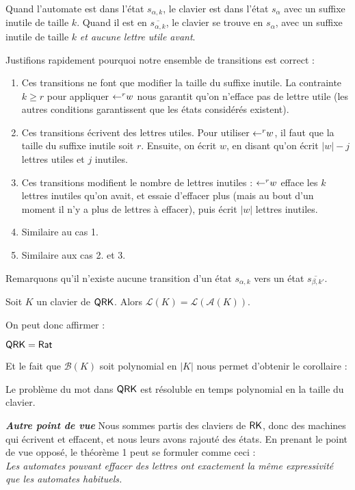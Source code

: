 \documentclass[12pt, a4paper]{article}
\renewcommand{\L}{\mathcal{L}}
\renewcommand{\bar}{\overline}
\newcommand{\A}{\mathcal{A}}
\newcounter{thm}
\begin{document}
    \begin{example}[Intuition]    
    Quand l'automate est dans l'état $s_{\alpha,k}$, le clavier est dans l'état $s_\alpha$ avec un suffixe inutile de taille $k$. Quand il est en $\overline{s_{\alpha,k}}$, le clavier se trouve en $s_\alpha$, avec un suffixe inutile de taille $k$ \emph{et aucune lettre utile avant}. 
    \end{example}
    Justifions rapidement pourquoi notre ensemble de transitions est correct :
    \begin{enumerate}
        \item Ces transitions ne font que modifier la taille du suffixe inutile. La contrainte $k \geqslant r$ pour appliquer $\mathord{\leftarrow}^r w$ nous garantit qu'on n'efface pas de lettre utile (les autres conditions garantissent que les états considérés existent).
        \item Ces transitions écrivent des lettres utiles. Pour utiliser $\mathord{\leftarrow}^r w$, il faut que la taille du suffixe inutile soit $r$. Ensuite, on écrit $w$, en disant qu'on écrit $|w|-j$ lettres utiles et $j$ inutiles.
        \item Ces transitions modifient le nombre de lettres inutiles : $\mathord{\leftarrow}^r w$ efface les $k$ lettres inutiles qu'on avait, et essaie d'effacer plus (mais au bout d'un moment il n'y a plus de lettres à effacer), puis écrit $|w|$ lettres inutiles.
        \item Similaire au cas 1.
        \item Similaire aux cas 2. et 3.
    \end{enumerate}
    Remarquons qu'il n'existe aucune transition d'un état $s_{\alpha, k}$ vers un état $\bar{s_{\beta, k'}}$.

    \begin{bisimautomclav}\label{lklak}
        Soit $K$ un clavier de $\mathsf{QRK}$. Alors $\L(K) = \L(\A(K))$.
    \end{bisimautomclav}
    On peut donc affirmer :
    \begin{QRKegalRat}
        $\mathsf{QRK} = \mathsf{Rat}$
    \end{QRKegalRat}
    Et le fait que $\mathcal{B}(K)$ soit polynomial en $|K|$ nous permet d'obtenir le corollaire :
    \begin{motQRK}\label{th1}
        Le problème du mot dans $\mathsf{QRK}$ est résoluble en temps polynomial en la taille du clavier.
    \end{motQRK} 
    \newpage
    \begin{thmbox}[L]{\textbf{\emph{Autre point de vue}}}
        Nous sommes partis des claviers de $\mathsf{RK}$, donc des machines qui écrivent et effacent, et nous leurs avons rajouté des états.
        En prenant le point de vue opposé, le théorème 1 peut se formuler comme ceci : \\
        \emph{Les automates pouvant effacer des lettres ont exactement la même expressivité que les automates habituels.}
    \end{thmbox}
    \newpage
\end{document}
